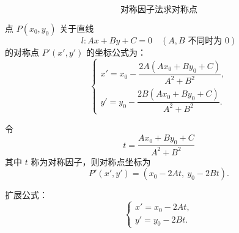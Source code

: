\[
	\text{对称因子法求对称点}
\]

点 $P(x_0,y_0)$ 关于直线
\[
	l:Ax+By+C=0\quad (A,B\text{ 不同时为 }0)
\]
的对称点 $P'(x',y')$ 的坐标公式为：
\[
	\begin{cases}
		x'=x_0-\dfrac{2A(Ax_0+By_0+C)}{A^2+B^2}, \\[6pt]
		y'=y_0-\dfrac{2B(Ax_0+By_0+C)}{A^2+B^2}.
	\end{cases}
\]

令
\[
	t=\dfrac{Ax_0+By_0+C}{A^2+B^2}
\]
其中 $t$ 称为对称因子，则对称点坐标为
\[
	P'(x',y')=(x_0-2At,\ y_0-2Bt).
\]

扩展公式：
\[
	\begin{cases}
		x'=x_0-2At, \\
		y'=y_0-2Bt.
	\end{cases}
\]